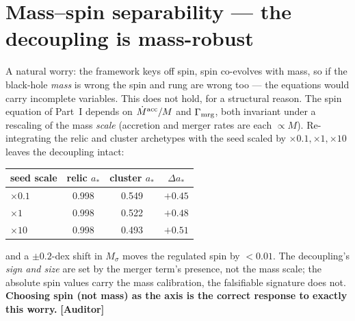 \documentclass[11pt]{article}
\newcommand{\Auditor}{\textbf{\textcolor{teal!55!black}{[Auditor]}}}
\begin{document}
\section{Mass--spin separability --- the decoupling is mass-robust}
A natural worry: the framework keys off spin, spin co-evolves with mass, so if the black-hole \emph{mass} is wrong the spin and rung are wrong too --- the equations would carry incomplete variables. This does not hold, for a structural reason. The spin equation of Part~I depends on $\dot M^{\rm acc}/M$ and $\Gamma_{\rm mrg}$, both invariant under a rescaling of the mass \emph{scale} (accretion and merger rates are each $\propto M$). Re-integrating the relic and cluster archetypes with the seed scaled by $\times0.1,\times1,\times10$ leaves the decoupling intact:
\begin{center}\small
\begin{tabular}{@{}lccc@{}}
\toprule
seed scale & relic $a_\ast$ & cluster $a_\ast$ & $\Delta a_\ast$ \\
\midrule
$\times0.1$ & 0.998 & 0.549 & $+0.45$ \\
$\times1$   & 0.998 & 0.522 & $+0.48$ \\
$\times10$  & 0.998 & 0.493 & $+0.51$ \\
\bottomrule
\end{tabular}
\end{center}
and a $\pm0.2$-dex shift in $M_\sigma$ moves the regulated spin by $<0.01$. The decoupling's \emph{sign and size} are set by the merger term's presence, not the mass scale; the absolute spin values carry the mass calibration, the falsifiable signature does not. \textbf{Choosing spin (not mass) as the axis is the correct response to exactly this worry.} \Auditor
\end{document}
